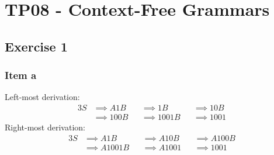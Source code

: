 \documentclass[docid=TP08]{tcom_TP}
\begin{document}
\setcounter{section}{7}
\section{TP08 - Context-Free Grammars}
{
\renewcommand{\thesubsubsection}{\thesubsection\alph{subsubsection}}
\subsection{Exercise 1}
\subsubsection{Item a}
\begin{minipage}[b]{0.6\textwidth}
	Left-most derivation:
	\begin{alignat*}{3}
		S &\implies A1B  &&\implies 1B    &&\implies 10B \\
		  &\implies 100B &&\implies 1001B &&\implies 1001
	\end{alignat*}
	Right-most derivation:
	\begin{alignat*}{3}
		S &\implies A1B    &&\implies A10B  &&\implies A100B \\
		  &\implies A1001B &&\implies A1001 &&\implies 1001
	\end{alignat*}
\end{minipage}
\begin{minipage}[c]{0.35\textwidth}
	\begin{center}
	\end{center}
\end{minipage}
}
\end{document}
